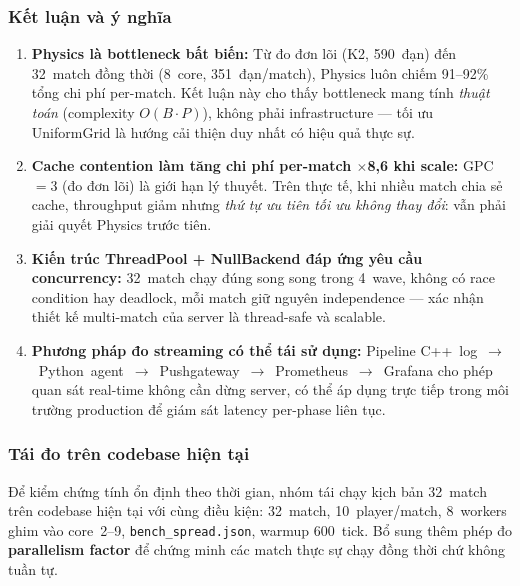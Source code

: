 \documentclass[12pt,a4paper]{report}
\begin{document}
\subsubsection*{Kết luận và ý nghĩa}

\begin{enumerate}
  \item \textbf{Physics là bottleneck bất biến:} Từ đo đơn lõi (K2, 590~đạn)
        đến 32~match đồng thời (8~core, 351~đạn/match), Physics luôn chiếm
        91--92\% tổng chi phí per-match. Kết luận này cho thấy bottleneck
        mang tính \emph{thuật toán} (complexity $O(B{\cdot}P)$), không phải
        infrastructure --- tối ưu UniformGrid là hướng cải thiện duy nhất
        có hiệu quả thực sự.

  \item \textbf{Cache contention làm tăng chi phí per-match $\times$8{,}6
        khi scale:} GPC~$=3$ (đo đơn lõi) là giới hạn lý thuyết. Trên thực
        tế, khi nhiều match chia sẻ cache, throughput giảm nhưng \emph{thứ
        tự ưu tiên tối ưu không thay đổi}: vẫn phải giải quyết Physics
        trước tiên.

  \item \textbf{Kiến trúc ThreadPool + NullBackend đáp ứng yêu cầu concurrency:}
        32~match chạy đúng song song trong 4~wave, không có race condition hay
        deadlock, mỗi match giữ nguyên independence --- xác nhận thiết kế
        multi-match của server là thread-safe và scalable.

  \item \textbf{Phương pháp đo streaming có thể tái sử dụng:} Pipeline
        C++~log~$\to$~Python~agent~$\to$~Pushgateway~$\to$~Prometheus~$\to$~Grafana
        cho phép quan sát real-time không cần dừng server, có thể áp dụng
        trực tiếp trong môi trường production để giám sát latency per-phase
        liên tục.
\end{enumerate}

\subsubsection*{Tái đo trên codebase hiện tại}

Để kiểm chứng tính ổn định theo thời gian, nhóm tái chạy kịch bản 32~match trên
codebase hiện tại với cùng điều kiện: 32~match, 10~player/match, 8~workers
ghim vào core~2--9, \texttt{bench\_spread.json}, warmup 600~tick.
Bổ sung thêm phép đo \textbf{parallelism factor} để chứng minh các match
thực sự chạy đồng thời chứ không tuần tự.
\end{document}
